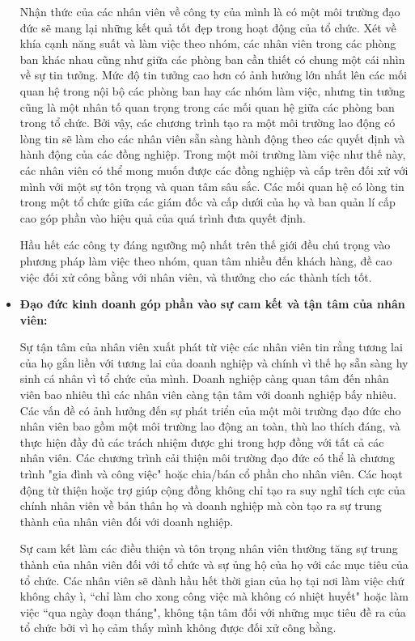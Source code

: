 \documentclass{article}
\begin{document}
\begin{itemize}
                \qquad Nhận thức của các nhân viên về công ty của mình là có một môi trường đạo đức sẽ mang lại những kết quả tốt đẹp trong hoạt động của tổ chức. Xét về khía cạnh năng suất và làm việc theo nhóm, các nhân viên trong các phòng ban khác nhau cũng như giữa các phòng ban cần thiết có chung một cái nhìn về sự tin tưởng. Mức độ tin tưởng cao hơn có ảnh hưởng lớn nhất lên các mối quan hệ trong nội bộ các phòng ban hay các nhóm làm việc, nhưng tin tưởng cũng là một nhân tố quan trọng trong các mối quan hệ giữa các phòng ban trong tổ chức. Bởi vậy, các chương trình tạo ra một môi trường lao động có lòng tin sẽ làm cho các nhân viên sẵn sàng hành động theo các quyết định và hành động của các đồng nghiệp. Trong một môi trường làm việc như thế này, các nhân viên có thể mong muốn được các đồng nghiệp và cấp trên đối xử với mình với một sự tôn trọng và quan tâm sâu sắc. Các mối quan hệ có lòng tin trong một tổ chức giữa các giám đốc và cấp dưới của họ và ban quản lí cấp cao góp phần vào hiệu quả của quá trình đưa quyết định.

                \qquad Hầu hết các công ty đáng ngưỡng mộ nhất trên thế giới đều chú trọng vào phương pháp làm việc theo nhóm, quan tâm nhiều đến khách hàng, đề cao việc đối xử công bằng với nhân viên, và thưởng cho các thành tích tốt.

                \item \textbf{Đạo đức kinh doanh góp phần vào sự cam kết và tận tâm của nhân viên:}
                
                \qquad Sự tận tâm của nhân viên xuất phát từ việc các nhân viên tin rằng tương lai của họ gắn liền với tương lai của doanh nghiệp và chính vì thế họ sẵn sàng hy sinh cá nhân vì tổ chức của mình. Doanh nghiệp càng quan tâm đến nhân viên bao nhiêu thì các nhân viên càng tận tâm với doanh nghiệp bấy nhiêu. Các vấn đề có ảnh hưởng đến sự phát triển của một môi trường đạo đức cho nhân viên bao gồm một môi trường lao động an toàn, thù lao thích đáng, và thực hiện đầy đủ các trách nhiệm được ghi trong hợp đồng với tất cả các nhân viên. Các chương trình cải thiện môi trường đạo đức có thể là chương trình "gia đình và công việc" hoặc chia/bán cổ phần cho nhân viên. Các hoạt động từ thiện hoặc trợ giúp cộng đồng không chỉ tạo ra suy nghĩ tích cực của chính nhân viên về bản thân họ và doanh nghiệp mà còn tạo ra sự trung thành của nhân viên đối với doanh nghiệp.

                \qquad Sự cam kết làm các điều thiện và tôn trọng nhân viên thường tăng sự trung thành của nhân viên đối với tổ chức và sự ủng hộ của họ với các mục tiêu của tổ chức. Các nhân viên sẽ dành hầu hết thời gian của họ tại nơi làm việc chứ không chây ì, “chỉ làm cho xong công việc mà không có nhiệt huyết" hoặc làm việc “qua ngày đoạn tháng", không tận tâm đối với những mục tiêu đề ra của tổ chức bởi vì họ cảm thấy mình không được đối xử công bằng.


\end{itemize}
\end{document}
